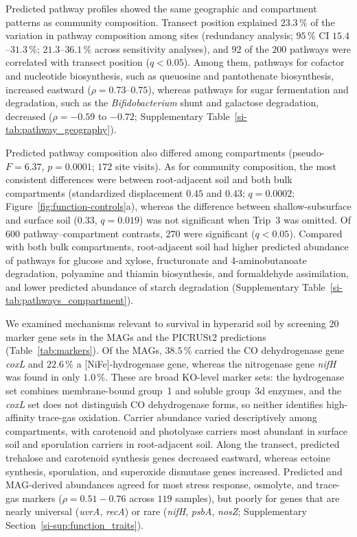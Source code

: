 \documentclass[fleqn,10pt,numbers]{olplainarticle}
\begin{document}
Predicted pathway profiles showed the same geographic and compartment patterns as community composition. Transect position explained $23.3\,\%$ of the variation in pathway composition among sites (redundancy analysis; $95\,\%$ CI $15.4$--$31.3\,\%$; $21.3$--$36.1\,\%$ across sensitivity analyses), and $92$ of the $200$ pathways were correlated with transect position ($q<0.05$). Among them, pathways for cofactor and nucleotide biosynthesis, such as queuosine and pantothenate biosynthesis, increased eastward ($\rho=0.73$--$0.75$), whereas pathways for sugar fermentation and degradation, such as the \textit{Bifidobacterium} shunt and galactose degradation, decreased ($\rho=-0.59$ to $-0.72$; Supplementary Table~\ref{si-tab:pathway_geography}).

Predicted pathway composition also differed among compartments (pseudo-$F=6.37$, $p=0.0001$; $172$ site visits). As for community composition, the most consistent differences were between root-adjacent soil and both bulk compartments (standardized displacement $0.45$ and $0.43$; $q=0.0002$; Figure~\ref{fig:function-controls}a), whereas the difference between shallow-subsurface and surface soil ($0.33$, $q=0.019$) was not significant when Trip~$3$ was omitted. Of $600$ pathway--compartment contrasts, $270$ were significant ($q<0.05$). Compared with both bulk compartments, root-adjacent soil had higher predicted abundance of pathways for glucose and xylose, fructuronate and 4-aminobutanoate degradation, polyamine and thiamin biosynthesis, and formaldehyde assimilation, and lower predicted abundance of starch degradation (Supplementary Table~\ref{si-tab:pathways_compartment}).

We examined mechanisms relevant to survival in hyperarid soil by screening $20$ marker gene sets in the MAGs and the PICRUSt2 predictions (Table~\ref{tab:markers}). Of the MAGs, $38.5\,\%$ carried the CO dehydrogenase gene \textit{coxL} and $22.6\,\%$ a [NiFe]-hydrogenase gene, whereas the nitrogenase gene \textit{nifH} was found in only $1.0\,\%$. These are broad KO-level marker sets: the hydrogenase set combines membrane-bound group~1 and soluble group~3d enzymes, and the \textit{coxL} set does not distinguish CO dehydrogenase forms, so neither identifies high-affinity trace-gas oxidation. Carrier abundance varied descriptively among compartments, with carotenoid and photolyase carriers most abundant in surface soil and sporulation carriers in root-adjacent soil. Along the transect, predicted trehalose and carotenoid synthesis genes decreased eastward, whereas ectoine synthesis, sporulation, and superoxide dismutase genes increased. Predicted and MAG-derived abundances agreed for most stress response, osmolyte, and trace-gas markers ($\rho=0.51-0.76$ across $119$ samples), but poorly for genes that are nearly universal (\textit{uvrA}, \textit{recA}) or rare (\textit{nifH}, \textit{psbA}, \textit{nosZ}; Supplementary Section~\ref{si-sup:function_traits}).
\end{document}
